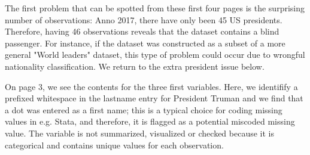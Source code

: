 \documentclass[article,shortnames]{jss}
\begin{document}
The first problem that can be spotted from these first four pages is the surprising number of observations: Anno 2017, there have only been 45 US presidents. Therefore, having 46 observations reveals that the dataset contains a blind passenger. For instance, if the dataset was constructed as a subset of a more general "World leaders" dataset, this type of problem could occur due to wrongful nationality classification. We return to the extra president issue below. 

On page 3, we see the contents for the three first variables. Here, we identifify a prefixed whitespace in the lastname entry for President Truman and we find that a dot was entered as a first name; this is a typical choice for coding missing values in e.g. Stata, and therefore, it is flagged as a potential miscoded missing value. The variable  is not summarized, visualized or checked because it is categorical and contains unique values for each observation. 
\end{document}
